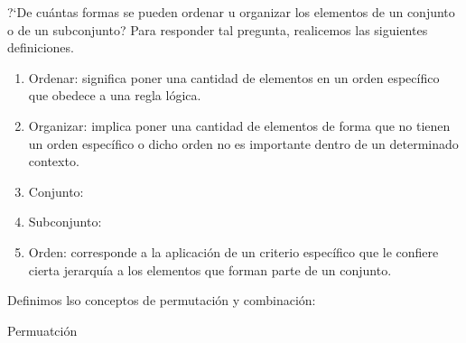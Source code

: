 ?`De cu\'antas formas se pueden ordenar u organizar los elementos de un conjunto o de un subconjunto? Para responder tal pregunta, realicemos
las siguientes definiciones. 
\begin{definition}
    \hspace{0.5mm}
    \begin{enumerate}[{\rm 1.}]        
        \item {\rm Ordenar: } significa poner una cantidad de elementos en un orden espec\'ifico que obedece a una regla l\'ogica.
        \item {\rm Organizar: } implica poner una cantidad de elementos de forma que no tienen un orden espec\'ifico o dicho orden no es importante 
        dentro de un determinado contexto.
        \item {\rm Conjunto: } 
        \item {\rm Subconjunto: } 
        \item {\rm Orden: } corresponde a la aplicaci\'on de un criterio espec\'ifico que le confiere cierta jerarqu\'ia a los elementos que forman parte de un conjunto. 
        
    \end{enumerate}
\end{definition}

Definimos lso conceptos de permutaci\'on y combinaci\'on: 

\begin{definition}{Permuatci\'on}

\end{definition}


    

